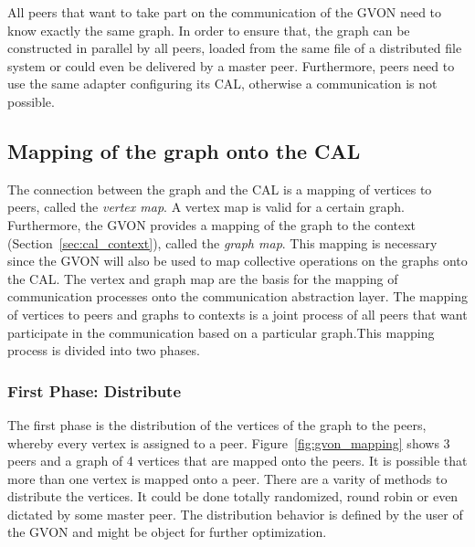 All peers that want to take part on the communication of the GVON need
to know exactly the same graph. In order to ensure that, the graph can be
constructed in parallel by all peers, loaded from the same file of a
distributed file system or could even be delivered by a master
peer. Furthermore, peers need to use the same adapter configuring its
CAL, otherwise a communication is not possible.


\subsection{Mapping of the graph onto the CAL}
\label{sec:mapping}
The connection between the graph and the CAL is a mapping of vertices
to peers, called the \emph{vertex map}.  A vertex map is valid for a
certain graph. Furthermore, the GVON provides a mapping of the graph
to the context (Section~\ref{sec:cal_context}), called the \emph{graph
  map}. This mapping is necessary since the GVON will also be used to
map collective operations on the graphs onto the CAL.  The vertex and
graph map are the basis for the mapping of communication processes
onto the communication abstraction layer.  The mapping of vertices to
peers and graphs to contexts is a joint process of all peers that want
participate in the communication based on a particular graph.This
mapping process is divided into two phases.

\subsubsection*{First Phase: Distribute}
The first phase is the distribution of the vertices of the graph to
the peers, whereby every vertex is assigned to a peer.
Figure~\ref{fig:gvon_mapping} shows 3 peers and a graph of 4 vertices
that are mapped onto the peers. It is possible that more than one
vertex is mapped onto a peer.  There are a varity of methods to
distribute the vertices.  It could be done totally randomized, round
robin or even dictated by some master peer. The distribution behavior
is defined by the user of the GVON and might be object for further
optimization.

